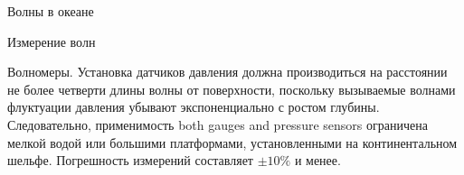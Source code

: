 \begin{chapter}{Волны в океане}
\begin{section}{Измерение волн}
\begin{paragraph}{Волномеры.}
Установка датчиков давления должна производиться на расстоянии не более
четверти длины волны от поверхности, поскольку вызываемые волнами флуктуации
давления убывают экспоненциально с ростом глубины. Следовательно, применимость
both gauges and pressure sensors ограничена мелкой водой или большими 
платформами, установленными на континентальном шельфе.
Погрешность измерений 
составляет $\pm 10\%$ и менее.
%
\end{paragraph}


\end{section}
\end{chapter}
